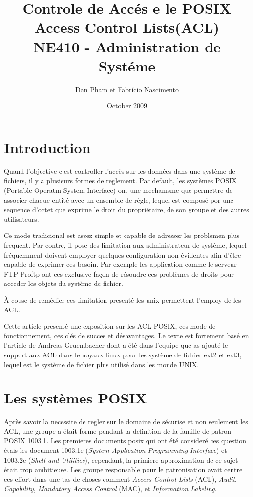 \documentclass[draft]{article}
\title{\textbf{Controle de Accés e le POSIX Access Control Lists(ACL)} \\ NE410 - Administration de Systéme }
\author{Dan Pham et Fabrício Nascimento}
\date{October 2009}
\begin{document}
\maketitle
\newpage
\section*{Introduction}

Quand l'objective c'est controller l'accès sur les données dans une système de fichiers, il y a plusieurs formes de reglement. Par default, les systèmes POSIX (Portable Operatin System Interface)\cite{ieee1,ieee2} ont une mechanisme que permettre de associer chaque entité avec un ensemble de régle, lequel est composé por une sequence d'octet que exprime le droit du propriétaire, de son groupe et des autres utilisateurs. 

Ce mode tradicional est assez simple et capable de adresser les problemen plus frequent. Par contre, il pose des limitation aux administrateur de système, lequel fréquemment doivent employer quelques configuration non évidentes afin d'être capable de exprimer ces besoin. Par exemple les application comme le serveur FTP Proftp\cite{ftp} ont ces exclusive façon de résoudre ces problèmes de droits pour acceder les objets du système de fichier.

À couse de remédier ces limitation presenté les unix permettent l'employ de les ACL.   

Cette article presenté une exposition sur les ACL POSIX, ces mode de fonctionnement, ces clés de succes et désavantages. Le texte est fortement basé en l'article de Andreas Gruembacher\cite{aclsuse} dont a été dans l'equipe que as ajouté le support aux ACL dans le noyaux linux pour les système de fichier ext2 et ext3, lequel est le système de fichier plus utilisé dans les monde UNIX.

\section*{Les systèmes POSIX}


Après savoir la necessite de regler sur le domaine de sécurise et non seulement les ACL, une groupe a était forme pendant la definition de la famille de patron POSIX 1003.1. Les premieres documents posix qui ont été consideré ces question étais les document 1003.1e (\emph{System Application Programming Interface}) et 1003.2c (\emph{Shell and Utilities}), cependant, la primiere approximation de ce sujet était trop ambitieuse. Les groupe responsable pour le patronisation avait centre ces effort dans une tas de choses comment \emph{Access Control Lists} (ACL), \emph{Audit}, \emph{Capability},\emph{ Mandatory Access Control }(MAC), et \emph{Information Labeling}\cite{aclsuse}.
\end{document}
